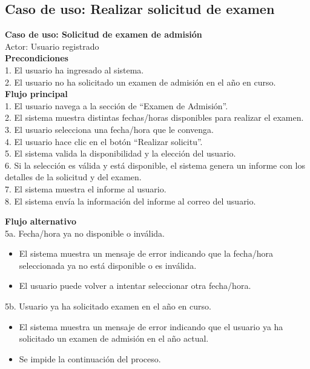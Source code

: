 \documentclass[12pt,a4paper]{article}
\begin{document}
\subsection{Caso de uso: Realizar solicitud de examen}

\begin{tcolorbox}[colback=white, colframe=black, rounded corners]
  {\Large \textbf{Caso de uso: Solicitud de examen de admisión}} \\
  {\large Actor: Usuario registrado} \vspace*{0.5cm} \\
  {{\large \textbf{Precondiciones}} \\
  1. El usuario ha ingresado al sistema. \\
  2. El usuario no ha solicitado un examen de admisión en el año en curso.
  } \vspace*{0.5cm} \\
  {{\large \textbf{Flujo principal}} \\
  1. El usuario navega a la sección de ``Examen de Admisión''. \\
  2. El sistema muestra distintas fechas/horas disponibles para realizar el examen. \\
  3. El usuario selecciona una fecha/hora que le convenga. \\
  4. El usuario hace clic en el botón ``Realizar solicitu''. \\
  5. El sistema valida la disponibilidad y la elección del usuario. \\
  6. Si la selección es válida y está disponible, el sistema genera un informe con los detalles de la solicitud y del examen. \\
  7. El sistema muestra el informe al usuario. \\
  8. El sistema envía la información del informe al correo del usuario.
  } \vspace*{0.5cm} \\
  {{\large \textbf{Flujo alternativo}} \\
  5a. Fecha/hora ya no disponible o inválida.
  \begin{itemize}
    \item El sistema muestra un mensaje de error indicando que la fecha/hora seleccionada ya no está disponible o es inválida.
    \item El usuario puede volver a intentar seleccionar otra fecha/hora.
  \end{itemize}
  5b. Usuario ya ha solicitado examen en el año en curso.
  \begin{itemize}
    \item El sistema muestra un mensaje de error indicando que el usuario ya ha solicitado un examen de admisión en el año actual.
    \item Se impide la continuación del proceso.
  \end{itemize}
}
\end{tcolorbox}
\end{document}
